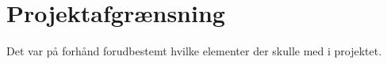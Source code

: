 \chapter{Projektafgrænsning}
Det var på forhånd forudbestemt hvilke elementer der skulle med i projektet. 